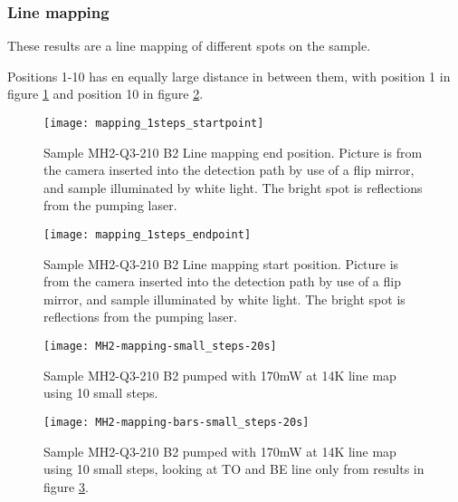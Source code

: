 \subsubsection{Line mapping}

These results are a line mapping of different spots on the sample.

Positions 1-10 has en equally large distance in between them, with position 1 in figure \ref{fig:mapping_1steps_startpoint} and position 10 in figure \ref{fig:mapping_1steps_endpoint}.

\begin{figure}[H]
\centering
\texttt{[image: mapping\_1steps\_startpoint]}
\caption[MH2-Q3-210 line mapping start position]{Sample MH2-Q3-210 B2 Line mapping end position. Picture is from the camera inserted into the detection path by use of a flip mirror, and sample illuminated by white light. The bright spot is reflections from the pumping laser.}
\label{fig:mapping_1steps_startpoint}%
\end{figure}


\begin{figure}[H]
\centering
\texttt{[image: mapping\_1steps\_endpoint]}
\caption[MH2-Q3-210 line mapping start position]{Sample MH2-Q3-210 B2 Line mapping start position. Picture is from the camera inserted into the detection path by use of a flip mirror, and sample illuminated by white light. The bright spot is reflections from the pumping laser.}
\label{fig:mapping_1steps_endpoint}%
\end{figure}

\begin{figure}[H]
\centering
\texttt{[image: MH2-mapping-small\_steps-20s]}
\caption[MH2-Q3-210 line mapping]{Sample MH2-Q3-210 B2 pumped with 170mW at 14K line map using 10 small steps.}
\label{fig:MH2-mapping-small_steps-20s}%
\end{figure}

\begin{figure}[H]
\centering
\texttt{[image: MH2-mapping-bars-small\_steps-20s]}
\caption[MH2-Q3-210 line mapping]{Sample MH2-Q3-210 B2 pumped with 170mW at 14K line map using 10 small steps, looking at TO and BE line only from results in figure \ref{fig:MH2-mapping-small_steps-20s}.}
\label{fig:MH2-mapping-bars-small_steps-20s}%
\end{figure}





